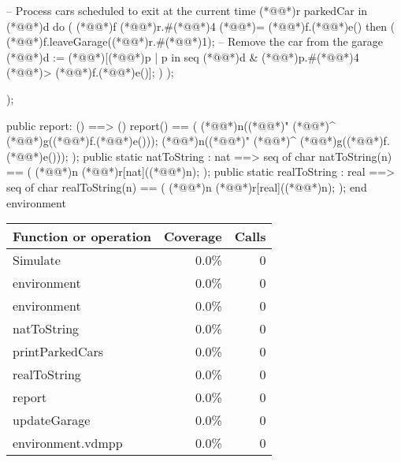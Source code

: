 \documentclass[a4paper]{article}
\begin{document}
\begin{vdm_al}
    -- Process cars scheduled to exit at the current time
    (*@@*)r parkedCar in (*@@*)d do
    (
        (*@@*)f (*@@*)r.#(*@\vdmnotcovered{}@*)4 (*@\vdmnotcovered{}@*)= (*@@*)f.(*@@*)e() then
        (
            (*@@*)f.leaveGarage((*@@*)r.#(*@\vdmnotcovered{}@*)1);  -- Remove the car from the garage
            (*@@*)d := (*@\vdmnotcovered{}@*)[(*@\vdmnotcovered{}@*)p | p in seq (*@@*)d & (*@\vdmnotcovered{}@*)p.#(*@\vdmnotcovered{}@*)4 (*@\vdmnotcovered{<}@*)> (*@@*)f.(*@@*)e()];
        )
    );

    
    
);



public report: () ==> ()
report() ==
(
   (*@@*)n((*@@*)" (*@\vdmnotcovered{}@*)^ (*@@*)g((*@@*)f.(*@@*)e()));
    (*@@*)n((*@@*)" (*@\vdmnotcovered{}@*)^ (*@@*)g((*@@*)f.(*@@*)e()));
);
public static natToString : nat ==> seq of char 
  natToString(n) ==
  (
   (*@@*)n (*@@*)r[nat]((*@\vdmnotcovered{}@*)n);
  );
public static realToString : real ==> seq of char
        realToString(n) ==
        (
            (*@@*)n (*@@*)r[real]((*@\vdmnotcovered{}@*)n);
        );
end environment
\end{vdm_al}
\bigskip
\begin{longtable}{|l|r|r|}
\hline
Function or operation & Coverage & Calls \\
\hline
\hline
Simulate & 0.0\% & 0 \\
\hline
environment & 0.0\% & 0 \\
\hline
environment & 0.0\% & 0 \\
\hline
natToString & 0.0\% & 0 \\
\hline
printParkedCars & 0.0\% & 0 \\
\hline
realToString & 0.0\% & 0 \\
\hline
report & 0.0\% & 0 \\
\hline
updateGarage & 0.0\% & 0 \\
\hline
\hline
environment.vdmpp & 0.0\% & 0 \\
\hline
\end{longtable}
\end{document}
